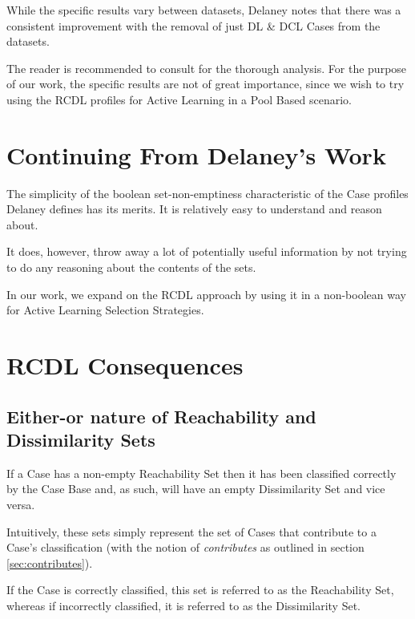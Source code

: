 \documentclass[a4paper,11pt]{report}
\begin{document}
While the specific results vary between datasets, Delaney notes that there was a consistent improvement with the removal of just DL \& DCL Cases from the datasets. 

The reader is recommended to consult \citet{Delany2009} for the thorough analysis. For the purpose of our work, the specific results are not of great importance, since we wish to try using the RCDL profiles for Active Learning in a Pool Based scenario.

\section{Continuing From Delaney's Work}
The simplicity of the boolean set-non-emptiness characteristic of the Case profiles Delaney defines has its merits. It is relatively easy to understand and reason about. 

It does, however, throw away a lot of potentially useful information by not trying to do any reasoning about the contents of the sets.

In our work, we expand on the RCDL approach by using it in a non-boolean way for Active Learning Selection Strategies.

\section{RCDL Consequences}

\subsection{Either-or nature of Reachability and Dissimilarity Sets}
If a Case has a non-empty Reachability Set then it has been classified correctly by the Case Base and, as such, will have an empty Dissimilarity Set and vice versa.

Intuitively, these sets simply represent the set of Cases that contribute to a Case's classification (with the notion of \emph{contributes} as outlined in section \ref{sec:contributes}). 

If the Case is correctly classified, this set is referred to as the Reachability Set, whereas if incorrectly classified, it is referred to as the Dissimilarity Set.
\end{document}
